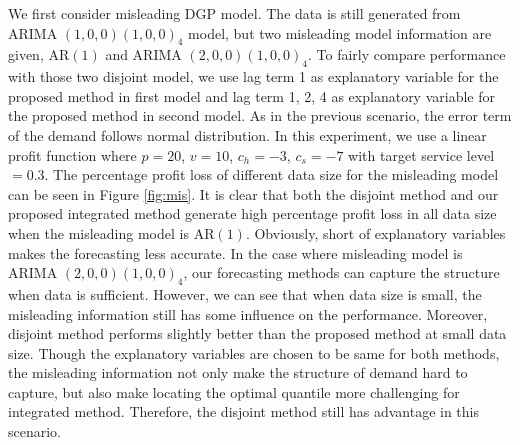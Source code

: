\documentclass{article}
\begin{document}
We first consider misleading DGP model. The data is still generated from ARIMA $(1,0,0)(1,0,0)_4$ model, but two misleading model information are given, AR$(1)$ and ARIMA $(2,0,0)(1,0,0)_4$. To fairly compare performance with those two disjoint model, we use lag term 1 as explanatory variable for the proposed method in first model and lag term 1, 2, 4 as explanatory variable for the proposed method in second model. As in the previous scenario, the error term of the demand follows normal distribution. In this experiment, we use a linear profit function where $p=20$, $v=10$, $c_h=-3$, $c_s=-7$ with target service level $=0.3$. The percentage profit loss of different data size for the misleading model can be seen in Figure \ref{fig:mis}. It is clear that both the disjoint method and our proposed integrated method generate high percentage profit loss in all data size when the misleading model is AR$(1)$. Obviously, short of explanatory variables makes the forecasting less accurate. In the case where misleading model is ARIMA $(2,0,0)(1,0,0)_4$, our forecasting methods can capture the structure when data is sufficient. However, we can see that when data size is small, the misleading information still has some influence on the performance. Moreover, disjoint method performs slightly better than the proposed method at small data size. Though the explanatory variables are chosen to be same for both methods, the misleading information not only make the structure of demand hard to capture, but also make locating the optimal quantile more challenging for integrated method. Therefore, the disjoint method still has advantage in this scenario.
\end{document}
